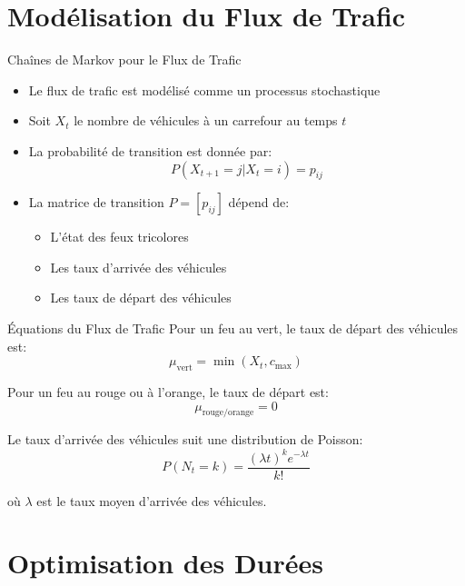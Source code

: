 \documentclass{beamer}
\begin{document}
\section{Modélisation du Flux de Trafic}

\begin{frame}{Chaînes de Markov pour le Flux de Trafic}
\begin{itemize}
    \item Le flux de trafic est modélisé comme un processus stochastique
    \item Soit $X_t$ le nombre de véhicules à un carrefour au temps $t$
    \item La probabilité de transition est donnée par:
    \begin{equation}
    P(X_{t+1} = j | X_t = i) = p_{ij}
    \end{equation}
    \item La matrice de transition $P = [p_{ij}]$ dépend de:
    \begin{itemize}
        \item L'état des feux tricolores
        \item Les taux d'arrivée des véhicules
        \item Les taux de départ des véhicules
    \end{itemize}
\end{itemize}
\end{frame}

\begin{frame}{Équations du Flux de Trafic}
Pour un feu au vert, le taux de départ des véhicules est:
\begin{equation}
\mu_{\text{vert}} = \min(X_t, c_{\text{max}})
\end{equation}

Pour un feu au rouge ou à l'orange, le taux de départ est:
\begin{equation}
\mu_{\text{rouge/orange}} = 0
\end{equation}

Le taux d'arrivée des véhicules suit une distribution de Poisson:
\begin{equation}
P(N_t = k) = \frac{(\lambda t)^k e^{-\lambda t}}{k!}
\end{equation}

où $\lambda$ est le taux moyen d'arrivée des véhicules.
\end{frame}

\section{Optimisation des Durées}
\end{document}
